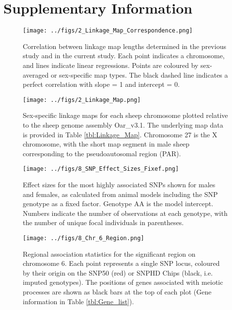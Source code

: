 \documentclass[a4paper,11pt]{article}
\begin{document}
\pagebreak

 


\section*{Supplementary Information}

\renewcommand{\thefigure}{S\arabic{figure}}
\setcounter{figure}{0}
\renewcommand{\thetable}{S\arabic{table}}
\setcounter{table}{0} 


\begin{figure}[H]
	\centering 
		\captionsetup{width=.9\textwidth}
    \texttt{[image: ../figs/2\_Linkage\_Map\_Correspondence.png]}
	\caption{Correlation between linkage map lengths determined in the previous study \citep{Johnston2016} and in the current study. Each point indicates a chromosome, and lines indicate linear regressions. Points are coloured by sex-averaged or sex-specific map types. The black dashed line indicates a perfect correlation with slope = 1 and intercept = 0.}
	\label{fig:Linkage_Map_R2}
\end{figure} 

\begin{figure}[H]
	\centering 
	\captionsetup{width=.9\textwidth}
	\texttt{[image: ../figs/2\_Linkage\_Map.png]}
	\caption{Sex-specific linkage maps for each sheep chromosome plotted relative to the sheep genome assembly Oar\_v3.1. The underlying map data is provided in Table \ref{tbl:Linkage_Map}. Chromosome 27 is the X chromosome, with the short map segment in male sheep corresponding to the pseudoautosomal region (PAR).}
	\label{fig:Sex_specific_linkage_maps}
\end{figure} 


\begin{figure}[H]
	\centering 
	\captionsetup{width=.9\textwidth}
	\texttt{[image: ../figs/8\_SNP\_Effect\_Sizes\_Fixef.png]}
	\caption{Effect sizes for the most highly associated SNPs shown for males and females, as calculated from animal models including the SNP genotype as a fixed factor. Genotype AA is the model intercept. Numbers indicate the number of observations at each genotype, with the number of unique focal individuals in parentheses.}
	\label{fig:SNP_Fixef_Sizes}
\end{figure} 


\begin{figure}[H]
	\centering 
	\captionsetup{width=.9\textwidth}
	\texttt{[image: ../figs/8\_Chr\_6\_Region.png]}
	\caption{Regional association statistics for the significant region on chromosome 6. Each point represents a single SNP locus, coloured by their origin on the SNP50 (red) or SNPHD Chips (black, i.e. imputed genotypes). The positions of genes associated with meiotic processes are shown as black bars at the top of each plot (Gene information in Table \ref{tbl:Gene_list}).}
	\label{fig:chr6_region}
\end{figure} 
\end{document}
